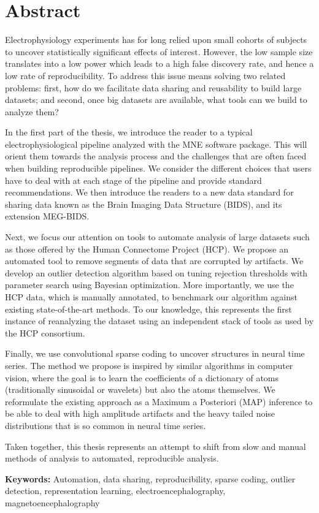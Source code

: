 \chapter*{Abstract}

Electrophysiology experiments has for long relied upon small cohorts of subjects to uncover statistically significant effects of interest. However, the low sample size translates into a low power which leads to a high false discovery rate, and hence a low rate of reproducibility. To address this issue means solving two related problems: first, how do we  facilitate data sharing and reusability to build large datasets; and second, once big datasets are available, what tools can we build to analyze them?

In the first part of the thesis, we introduce the reader to a typical electrophysiological pipeline analyzed with the MNE software package. This will orient them towards the analysis process and the challenges that are often faced when building reproducible pipelines. We consider the different choices that users have to deal with at each stage of the pipeline and provide standard recommendations. We then introduce the readers to a new data standard for sharing data known as the Brain Imaging Data Structure (BIDS), and its extension MEG-BIDS.

Next, we focus our attention on tools to automate analysis of large datasets such as those offered by the Human Connectome Project (HCP). We propose an automated tool to remove segments of data that are corrupted by artifacts. We develop an outlier detection algorithm based on tuning rejection thresholds with parameter search using Bayesian optimization. More importantly, we use the HCP data, which is manually annotated, to benchmark our algorithm against existing state-of-the-art methods. To our knowledge, this represents the first instance of reanalyzing the dataset using an independent stack of tools as used by the HCP consortium.

Finally, we use convolutional sparse coding to uncover structures in neural time series. The method we propose is inspired by similar algorithms in computer vision, where the goal is to learn the coefficients of a dictionary of atoms (traditionally sinusoidal or wavelets) but also the atoms themselves. We reformulate the existing approach as a Maximum a Posteriori (MAP) inference to be able to deal with high amplitude artifacts and the heavy tailed noise distributions that is so common in neural time series. 

Taken together, this thesis represents an attempt to shift from slow and manual methods of analysis to automated, reproducible analysis.

\textbf{Keywords:} Automation, data sharing, reproducibility, sparse coding, outlier detection, representation learning, electroencephalography, magnetoencephalography